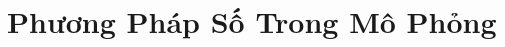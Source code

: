   
\chapter{Phương Pháp Số Trong Mô Phỏng}








\begin{refsection}
\nocite{golub2013matrix,langtangen2017finite,ienkiewicz2005finite,LoggEtal_10_2012}
\printbibliography
\end{refsection}